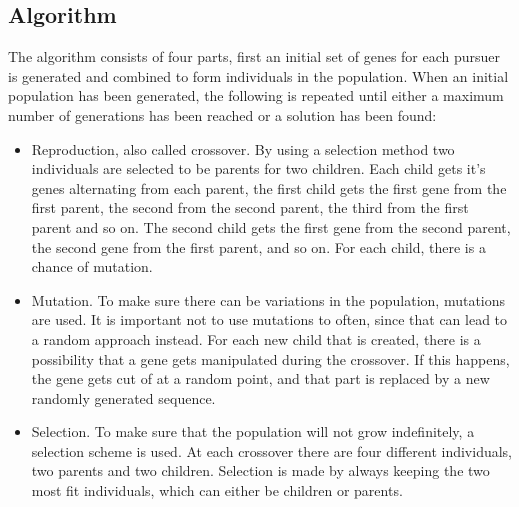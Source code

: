 \subsection{Algorithm}
The algorithm consists of four parts, first an initial set of genes for each pursuer is generated and combined to form individuals in the population. When an initial population has been generated, the following is repeated until either a maximum number of generations has been reached or a solution has been found:\\
\begin{itemize}
\item Reproduction, also called crossover. By using a selection method two individuals are selected to be parents for two children. Each child gets it's genes alternating from each parent, the first child gets the first gene from the first parent, the second from the second parent, the third from the first parent and so on. The second child gets the first gene from the second parent, the second gene from the first parent, and so on. For each child, there is a chance of mutation.
\item Mutation. To make sure there can be variations in the population, mutations are used. It is important not to use mutations to often, since that can lead to a random approach instead. For each new child that is created, there is a possibility that a gene gets manipulated during the crossover. If this happens, the gene gets cut of at a random point, and that part is replaced by a new randomly generated sequence.
\item Selection. To make sure that the population will not grow indefinitely, a selection scheme is used. At each crossover there are four different individuals, two parents and two children. Selection is made by always keeping the two most fit individuals, which can either be children or parents.
\end{itemize}

